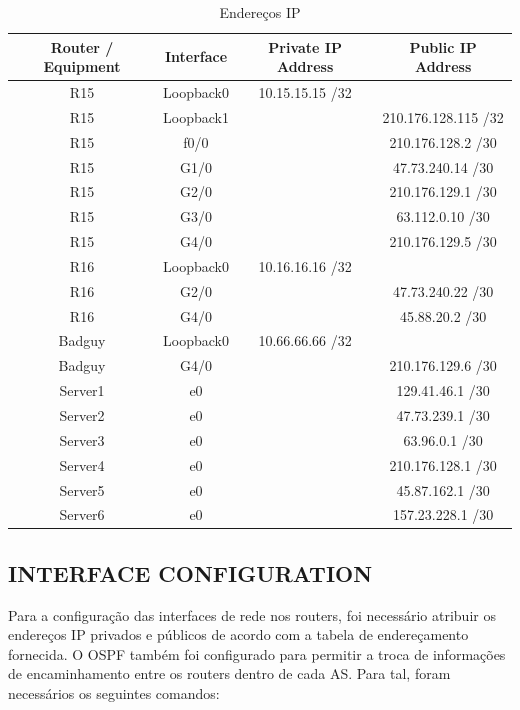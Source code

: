 \documentclass[11pt,english, openright, oneside]{book}
\begin{document}
\begin{table}[H]
\centering
\begin{tabular}{|c|c|c|c|}
\hline
\textbf{Router / Equipment} & \textbf{Interface} & \textbf{Private IP Address} & \textbf{Public IP Address} \\ \hline
R15 & Loopback0 & 10.15.15.15 /32 & \\ \hline
R15 & Loopback1 & & 210.176.128.115 /32 \\ \hline
R15 & f0/0 & & 210.176.128.2 /30 \\ \hline
R15 & G1/0 & & 47.73.240.14 /30 \\ \hline
R15 & G2/0 & & 210.176.129.1 /30 \\ \hline
R15 & G3/0 & & 63.112.0.10 /30 \\ \hline
R15 & G4/0 &  & 210.176.129.5 /30 \\ \hline
R16 & Loopback0 & 10.16.16.16 /32 & \\ \hline
R16 & G2/0 & & 47.73.240.22 /30 \\ \hline
R16 & G4/0 & & 45.88.20.2 /30 \\ \hline
Badguy & Loopback0 & 10.66.66.66 /32 & \\ \hline
Badguy & G4/0 & & 210.176.129.6 /30 \\ \hline
Server1 & e0 & & 129.41.46.1 /30 \\ \hline
Server2 & e0 & & 47.73.239.1 /30 \\ \hline
Server3 & e0 & & 63.96.0.1 /30 \\ \hline
Server4 & e0 & & 210.176.128.1 /30 \\ \hline
Server5 & e0 & & 45.87.162.1 /30 \\ \hline
Server6 & e0 & & 157.23.228.1 /30 \\ \hline
\end{tabular}
\caption{Endereços IP}
\label{tab:ip1}
\end{table}
\vspace{0.2cm}

\newpage
\subsection{INTERFACE CONFIGURATION}
\vspace{0.2cm}

Para a configuração das interfaces de rede nos routers, foi necessário atribuir os endereços IP privados e públicos de acordo com a tabela de endereçamento fornecida. O OSPF também foi configurado para permitir a troca de informações de encaminhamento entre os routers dentro de cada AS. Para tal, foram necessários os seguintes comandos:
\vspace{0.2cm}
\end{document}
